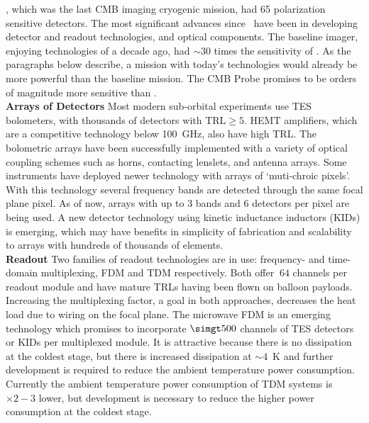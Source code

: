 \planck, which was the last CMB imaging cryogenic mission, had 65 polarization sensitive detectors. The most significant advances since \planck~have been in developing detector and readout technologies, and optical components. The baseline imager, enjoying technologies of a decade ago, had $\sim$30 times the sensitivity of \planck. As the paragraphs below describe, a mission with today's technologies would already be 
more powerful than the baseline mission.  The CMB Probe promises to be orders of magnitude more sensitive than \planck.\\
{\bf Arrays of Detectors} \hspace{0.025in} Most modern sub-orbital experiments use TES bolometers, with thousands of detectors with TRL$\geq 5$. HEMT amplifiers, which are a competitive technology below 100~GHz, also have high TRL. The bolometric arrays have been successfully implemented with a variety of optical coupling schemes such as horns, contacting lenslets, and antenna arrays. Some instruments have deployed newer technology with arrays of `muti-chroic pixels'. With this technology several frequency bands are detected through the same focal plane pixel. As of now, arrays with up to 3 bands and 6 detectors per pixel are being used. A new detector technology using kinetic inductance inductors (KIDs) is emerging, which may have benefits in simplicity of fabrication and scalability to arrays with hundreds of thousands of elements.  \\
{\bf Readout }  \hspace{0.025in} Two families of readout technologies are in use: frequency- and time-domain multiplexing, FDM and TDM respectively.  Both offer $~64$ channels per readout module and have mature TRLs having been flown on balloon payloads. Increasing the multiplexing factor, a goal in both approaches, decreases the heat load due to wiring on the focal plane. The microwave FDM is an emerging technology which promises to incorporate $\simgt 500$ channels of TES detectors or KIDs per multiplexed module. It is attractive because there is no dissipation at the coldest stage, but there is increased dissipation at $\sim 4$~K and further development is required to reduce the ambient temperature power consumption.  Currently the ambient temperature power consumption of TDM systems is $\times2-3$ lower, but development is necessary to reduce the higher power consumption at the coldest stage. \\
